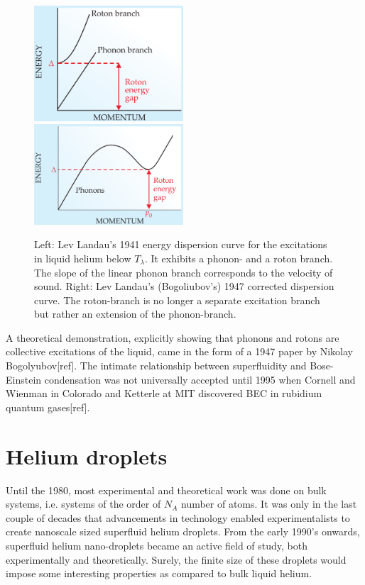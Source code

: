 \documentclass[11pt,a4paper,twoside]{article}
\begin{document}
		\begin{figure}[t]
			\begin{center}
				\includegraphics[width=0.495\textwidth]{phonon-roton-landau-first}
				\includegraphics[width=0.495\textwidth]{phonon-roton-bogoliubov}
			\end{center}
			\caption{Left: Lev Landau's 1941 energy dispersion curve for the excitations in liquid helium below $T_\lambda$. It exhibits a phonon- and a roton branch. The slope of the linear phonon branch corresponds to the velocity of sound. Right: Lev Landau's (Bogoliubov's) 1947 corrected dispersion curve. The roton-branch is no longer a separate excitation branch but rather an extension of the phonon-branch.}
			\label{fig:phonon-roton}
		\end{figure}

		A theoretical demonstration, explicitly showing that phonons and rotons are collective excitations of the liquid, came in the form of a 1947 paper by Nikolay Bogolyubov[ref]. The intimate relationship between superfluidity and Bose-Einstein condensation was not universally accepted until 1995 when Cornell and Wienman in Colorado and Ketterle at MIT discovered BEC in rubidium quantum gases[ref].

	\newpage
	\section{Helium droplets}
		Until the 1980, most experimental and theoretical work was done on bulk systems, i.e. systems of the order of $N_A$ number of atoms. It was only in the last couple of decades that advancements in technology enabled experimentalists to create nanoscale sized superfluid helium droplets. From the early 1990's onwards, superfluid helium nano-droplets became an active field of study, both experimentally and theoretically. Surely, the finite size of these droplets would impose some interesting properties as compared to bulk liquid helium.\\
		
\end{document}
